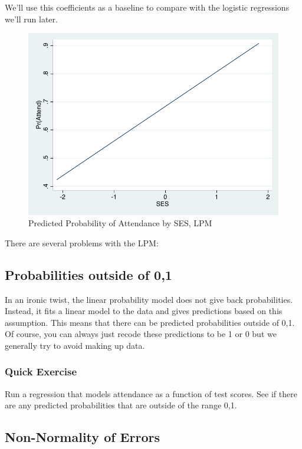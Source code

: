 \documentclass[12pt]{article}
\begin{document}
We'll use this coefficients as a baseline to compare with the logistic regressions we'll run later. 


\begin{figure}[h]
  \centering
  \includegraphics[width=\textwidth]{lpm}
  \caption{Predicted Probability of Attendance by SES, LPM}
\end{figure}



There are several problems with the LPM:


\subsection{Probabilities outside of 0,1}

In an ironic twist, the linear probability model does not give back
probabilities. Instead, it fits a linear model to the data and gives
predictions based on this assumption. This means that there can be
predicted probabilities outside of 0,1. Of course, you can always just
recode these predictions to be 1 or 0 but we generally try to avoid
making up data. 

\subsubsection{Quick Exercise}

Run a regression that models attendance as a function of test
scores. See if there are any predicted probabilities that are outside of the range 0,1. 

\subsection{Non-Normality of Errors}
\end{document}
